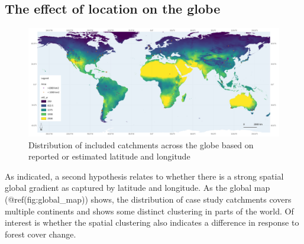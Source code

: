 \documentclass[]{elsarticle} %
\begin{document}
\hypertarget{the-effect-of-location-on-the-globe}{%
\subsection{The effect of location on the
globe}\label{the-effect-of-location-on-the-globe}}

\begin{figure}
\includegraphics[width=0.9\linewidth]{../../data/FAOET0data2} \caption{Distribution of included catchments across the globe based on reported or estimated latitude and longitude}\label{fig:global_map}
\end{figure}

As indicated, a second hypothesis relates to whether there is a strong
spatial global gradient as captured by latitude and longitude. As the
global map (@ref(fig:global\_map)) shows, the distribution of case study
catchments covers multiple continents and shows some distinct clustering
in parts of the world. Of interest is whether the spatial clustering
also indicates a difference in response to forest cover change.
\end{document}
